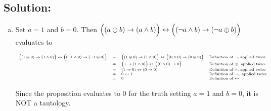 \documentclass[12pt]{article}
\begin{document}
	\subsection*{\textbf{Solution:}}
	\begin{enumerate}[(a)]
		\item
			\noindent
			Set $a=1$ and $b=0$. Then
			$\Bigl((a \oplus b) \rightarrow (a \land b)\Bigr) \leftrightarrow \Bigl((\neg
			a \land b) \rightarrow (\neg a \oplus b)\Bigr)$
			evaluates to

			\[
				\scriptsize
				\begin{array}{rcll}
					\Bigl((1 \oplus 0) \rightarrow (1 \land 0)\Bigr) \leftrightarrow \Bigl((\neg 1 \land 0) \rightarrow (\neg 1 \oplus 0)\Bigr) & = & \Bigl((1 \oplus 0) \rightarrow (1 \land 0)\Bigr) \leftrightarrow \Bigl((0 \land 0) \rightarrow (0 \oplus 0)\Bigr) & \mbox{Definition of $\neg$, applied twice}        \\
					                                                                                                                            & = & \Bigl(1 \rightarrow (1 \land 0)\Bigr) \leftrightarrow \Bigl((0 \land 0) \rightarrow 0\Bigr)                       & \mbox{Definition of $\oplus$, applied twice}      \\
					                                                                                                                            & = & (1 \rightarrow 0) \leftrightarrow (0 \rightarrow 0)                                                               & \mbox{Definition of $\land$, applied twice}       \\
					                                                                                                                            & = & 0 \leftrightarrow 1                                                                                               & \mbox{Definition of $\rightarrow$, applied twice} \\
					                                                                                                                            & = & 0                                                                                                                 & \mbox{Definition of $\leftrightarrow$}
				\end{array}
			\]

			\noindent
			Since the proposition evaluates to $0$ for the truth setting $a=1$ and
			$b=0$, it is NOT a tautology.


\end{enumerate}
\end{document}
